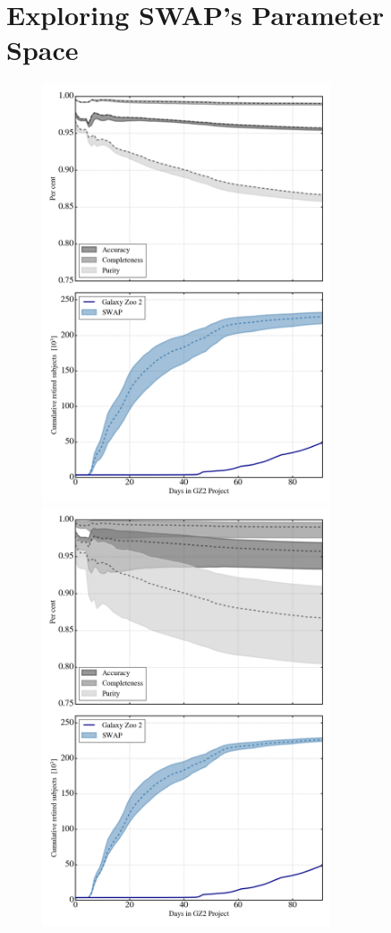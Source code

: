 \documentclass[twocolumn]{aastex6}
\begin{document}
\section{Exploring SWAP's Parameter Space}
\label{sec: tweaking swap}

\begin{figure}[t]
\includegraphics[width=3.35in]{figures/GZX_eval_and_retirement_PLPD_spread_4paper_v2.png}
\includegraphics[width=3.35in]{figures/GZX_eval_and_retirement_prior_spread_4paper_v2.png}

\end{figure}
\end{document}
